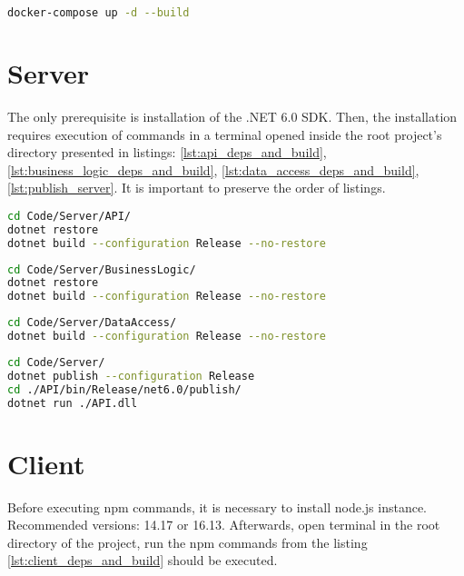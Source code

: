 \begin{lstlisting}[language=bash, caption={Docker compose.}, label=lst:docker_compose]
docker-compose up -d --build
\end{lstlisting}

\section{Server}\label{sec:server}
The only prerequisite is installation of the .NET 6.0 SDK. Then, the installation requires execution of commands in a terminal opened inside the root project's directory presented in listings: \ref{lst:api_deps_and_build}, \ref{lst:business_logic_deps_and_build}, \ref{lst:data_access_deps_and_build}, \ref{lst:publish_server}. It is important to preserve the order of listings. 


\begin{lstlisting}[language=bash, caption={Install dependencies and build \textit{API}.}, label=lst:api_deps_and_build]
cd Code/Server/API/
dotnet restore
dotnet build --configuration Release --no-restore
\end{lstlisting}

\begin{lstlisting}[language=bash, caption={Install dependencies and build \textit{BusinessLogic}.}, label=lst:business_logic_deps_and_build]
cd Code/Server/BusinessLogic/
dotnet restore
dotnet build --configuration Release --no-restore
\end{lstlisting}

\begin{lstlisting}[language=bash, caption={Install dependencies and build \textit{DataAccess}.}, label=lst:data_access_deps_and_build]
cd Code/Server/DataAccess/
dotnet build --configuration Release --no-restore
\end{lstlisting}

\begin{lstlisting}[language=bash, caption={Publish and run server application.}, label=lst:publish_server]
cd Code/Server/
dotnet publish --configuration Release
cd ./API/bin/Release/net6.0/publish/
dotnet run ./API.dll
\end{lstlisting}

\section{Client}\label{sec:client}
Before executing npm commands, it is necessary to install node.js instance. Recommended versions: 14.17 or 16.13. Afterwards, open terminal in the root directory of the project, run the npm commands from the listing \ref{lst:client_deps_and_build} should be executed.\\

